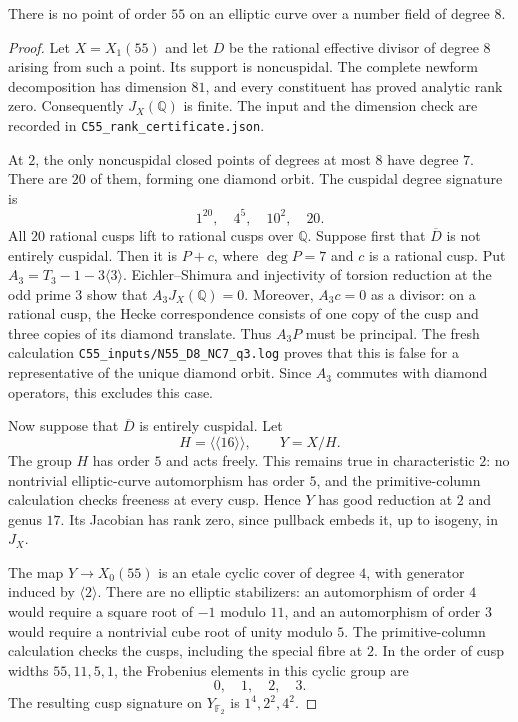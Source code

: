 \begin{proposition}\label{prop:octic-C55}
There is no point of order $55$ on an elliptic curve over a number field
of degree $8$.
\end{proposition}
\begin{proof}
Let $X=X_1(55)$ and let $D$ be the rational effective divisor of degree
$8$ arising from such a point. Its support is noncuspidal. The complete
newform decomposition has dimension $81$, and every constituent has
proved analytic rank zero. Consequently $J_X(\mathbb Q)$ is finite.
The input and the dimension check are recorded in
\texttt{C55\_rank\_certificate.json}.

At $2$, the only noncuspidal closed points of degrees at most $8$ have
degree $7$. There are $20$ of them, forming one diamond orbit. The
cuspidal degree signature is
\[
 1^{20},\quad4^5,\quad10^2,\quad20.
\]
All $20$ rational cusps lift to rational cusps over $\mathbb Q$.
Suppose first that $\overline D$ is not entirely cuspidal. Then it is
$P+c$, where $\deg P=7$ and $c$ is a rational cusp. Put
$A_3=T_3-1-3\langle3\rangle$. Eichler--Shimura and injectivity of torsion
reduction at the odd prime $3$ show that $A_3J_X(\mathbb Q)=0$.
Moreover, $A_3c=0$ as a divisor: on a rational cusp, the Hecke
correspondence consists of one copy of the cusp and three copies of
its diamond translate. Thus $A_3P$ must be principal. The fresh
calculation \texttt{C55\_inputs/N55\_D8\_NC7\_q3.log} proves that this is
false for a representative of the unique diamond orbit. Since $A_3$
commutes with diamond operators, this excludes this case.

Now suppose that $\overline D$ is entirely cuspidal. Let
\[
 H=\langle\langle16\rangle\rangle,\qquad Y=X/H.
\]
The group $H$ has order $5$ and acts freely. This remains true in
characteristic $2$: no nontrivial elliptic-curve automorphism has order
$5$, and the primitive-column calculation checks freeness at every
cusp. Hence $Y$ has good reduction at $2$ and genus $17$.
Its Jacobian has rank zero, since pullback embeds it, up to isogeny,
in $J_X$.

The map $Y\longrightarrow X_0(55)$ is an etale cyclic cover of degree
$4$, with generator induced by $\langle2\rangle$. There are no
elliptic stabilizers: an automorphism of order $4$ would require a
square root of $-1$ modulo $11$, and an automorphism of order $3$
would require a nontrivial cube root of unity modulo $5$. The
primitive-column calculation checks the cusps, including the special
fibre at $2$. In the order of cusp widths $55,11,5,1$, the Frobenius
elements in this cyclic group are
\[
 0,\quad1,\quad2,\quad3.
\]
The resulting cusp signature on $Y_{\mathbb F_2}$ is
$1^4,2^2,4^2$.


\end{proof}
